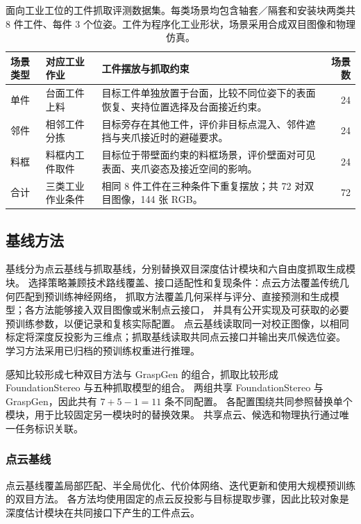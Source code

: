 \documentclass[UTF8,fontset=fandol,a4paper,11pt]{ctexart}
\newcommand{\qyb}[1]{#1}
\begin{document}
\begin{table}[H]
\centering\small
\caption{面向工业工位的工件抓取评测数据集。每类场景均包含轴套／隔套和安装块两类共 8 件工件、每件 3 个位姿。工件为程序化工业形状，场景采用合成双目图像和物理仿真。}
\label{tab:industrial-scenes}
\begin{tabularx}{\linewidth}{P{1.8cm}P{2.4cm}Y r}
\toprule
场景类型 & 对应工业作业 & 工件摆放与抓取约束 & 场景数 \\
\midrule
单件 & 台面工件上料 & 目标工件单独放置于台面，比较不同位姿下的表面恢复、夹持位置选择及台面接近约束。 & 24 \\
邻件 & 相邻工件分拣 & 目标旁存在其他工件，评价非目标点混入、邻件遮挡与夹爪接近时的避碰要求。 & 24 \\
料框 & 料框内工件取件 & 目标位于带壁面约束的料框场景，评价壁面对可见表面、夹爪姿态及接近空间的影响。 & 24 \\
\midrule
合计 & 三类工业作业条件 & 相同 8 件工件在三种条件下重复摆放；共 72 对双目图像，144 张 RGB。 & 72 \\
\bottomrule
\end{tabularx}
\end{table}

\subsection{\qyb{基线方法}}

基线分为点云基线与抓取基线，分别替换双目深度估计模块和六自由度抓取生成模块。
选择策略兼顾技术路线覆盖、接口适配性和复现条件：点云方法覆盖传统几何匹配到预训练神经网络，
抓取方法覆盖几何采样与评分、直接预测和生成模型；各方法能够接入双目图像或米制点云接口，
并具有公开实现及可获取的必要预训练参数，以便记录和复核实际配置。
点云基线读取同一对校正图像，以相同标定将深度反投影为三维点；抓取基线读取共同点云接口并输出夹爪候选位姿。
学习方法采用已归档的预训练权重进行推理。

感知比较形成七种双目方法与 GraspGen 的组合，抓取比较形成 FoundationStereo 与五种抓取模型的组合。
两组共享 FoundationStereo 与 GraspGen，因此共有 $7+5-1=11$ 条不同配置。
各配置围绕共同参照替换单个模块，用于比较固定另一模块时的替换效果。
共享点云、候选和物理执行通过唯一任务标识关联。

\subsubsection{点云基线}

点云基线覆盖局部匹配、半全局优化、代价体网络、迭代更新和使用大规模预训练的双目方法。
各方法均使用固定的点云反投影与目标提取步骤，因此比较对象是深度估计模块在共同接口下产生的工件点云。
\end{document}

